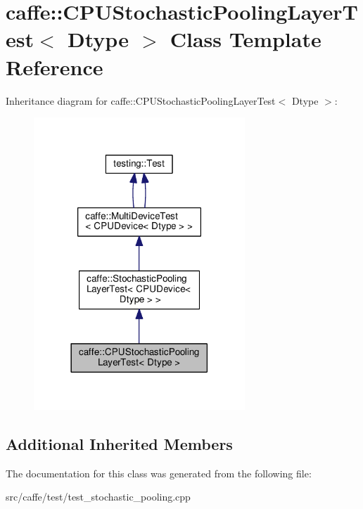 \hypertarget{classcaffe_1_1_c_p_u_stochastic_pooling_layer_test}{}\section{caffe\+:\+:C\+P\+U\+Stochastic\+Pooling\+Layer\+Test$<$ Dtype $>$ Class Template Reference}
\label{classcaffe_1_1_c_p_u_stochastic_pooling_layer_test}


Inheritance diagram for caffe\+:\+:C\+P\+U\+Stochastic\+Pooling\+Layer\+Test$<$ Dtype $>$\+:
\nopagebreak
\begin{figure}[H]
\begin{center}
\leavevmode
\includegraphics[width=225pt]{classcaffe_1_1_c_p_u_stochastic_pooling_layer_test__inherit__graph}
\end{center}
\end{figure}
\subsection*{Additional Inherited Members}


The documentation for this class was generated from the following file\+:\begin{DoxyCompactItemize}
\item 
src/caffe/test/test\+\_\+stochastic\+\_\+pooling.\+cpp\end{DoxyCompactItemize}
